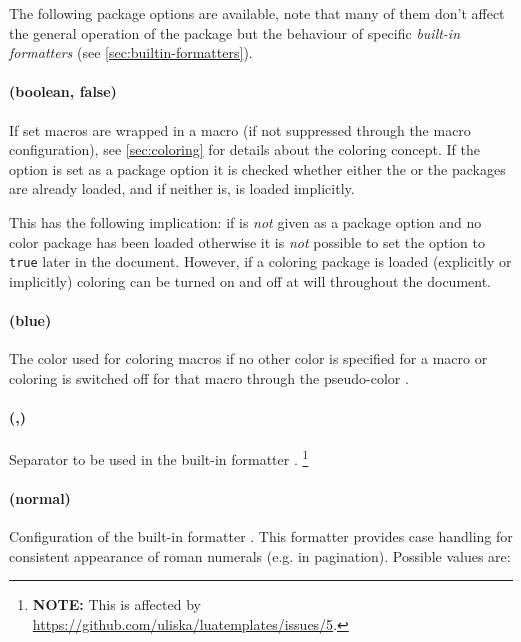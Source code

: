 \documentclass[12pt]{scrartcl}
\begin{document}
The following package options are available, note that many of them don't affect
the general operation of the package but the behaviour of specific
\emph{built-in formatters} (see \vref{sec:builtin-formatters}).


\paragraph{ (boolean, false)}

If set macros are wrapped in a  macro (if not suppressed through
the macro configuration),  see \vref{sec:coloring} for details about the
coloring concept.  If the option is set as a package option it is checked
whether either the  or the  packages are already
loaded, and if neither is,  is loaded implicitly.

This has the following implication: if  is \emph{not} given as a
package option and no color package has been loaded otherwise it is \emph{not}
possible to set the option to \texttt{true} later in the document.  However, if
a coloring package is loaded (explicitly or implicitly) coloring can be turned
on and off at will throughout the document.

\paragraph{ (blue)}

The color used for coloring macros if no other color is specified for a macro or
coloring is switched off for that macro through the pseudo-color
.


\paragraph{ (,)}

Separator to be used in the built-in formatter .%
\footnote{\textbf{NOTE:} This is affected by
\url{https://github.com/uliska/luatemplates/issues/5}.}


\paragraph{ (normal)}

Configuration of the built-in formatter .  This formatter
provides case handling for consistent appearance of roman numerals (e.g. in
pagination).  Possible values are:
\end{document}
